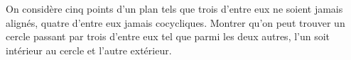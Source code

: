 On considère cinq points d'un plan tels que trois d'entre eux ne soient jamais alignés, quatre d'entre eux jamais cocycliques. Montrer qu'on peut trouver un cercle passant par trois d'entre eux tel que parmi les deux autres, l'un soit intérieur au cercle et l'autre extérieur.
